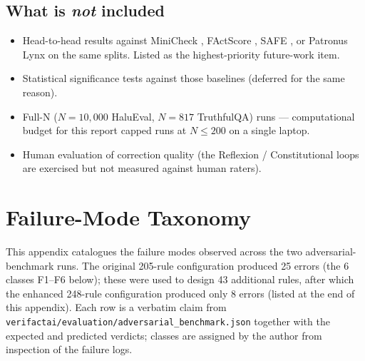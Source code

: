 \documentclass[12pt, a4paper, oneside]{report}
\begin{document}
\section{What is \emph{not} included}
\begin{itemize}[nosep]
    \item Head-to-head results against MiniCheck \cite{tang2024minicheck}, FActScore \cite{min2023factscore}, SAFE \cite{wei2024safe}, or Patronus Lynx \cite{patronus2024lynx} on the same splits. Listed as the highest-priority future-work item.
    \item Statistical significance tests against those baselines (deferred for the same reason).
    \item Full-N ($N=10{,}000$ HaluEval, $N=817$ TruthfulQA) runs --- computational budget for this report capped runs at $N\leq 200$ on a single laptop.
    \item Human evaluation of correction quality (the Reflexion / Constitutional loops are exercised but not measured against human raters).
\end{itemize}

\chapter{Failure-Mode Taxonomy}
\label{app:failures}

This appendix catalogues the failure modes observed across the two adversarial-benchmark runs. The original 205-rule configuration produced 25 errors (the 6 classes F1--F6 below); these were used to design 43 additional rules, after which the enhanced 248-rule configuration produced only 8 errors (listed at the end of this appendix). Each row is a verbatim claim from \texttt{verifactai/evaluation/adversarial\_benchmark.json} together with the expected and predicted verdicts; classes are assigned by the author from inspection of the failure logs.
\end{document}
